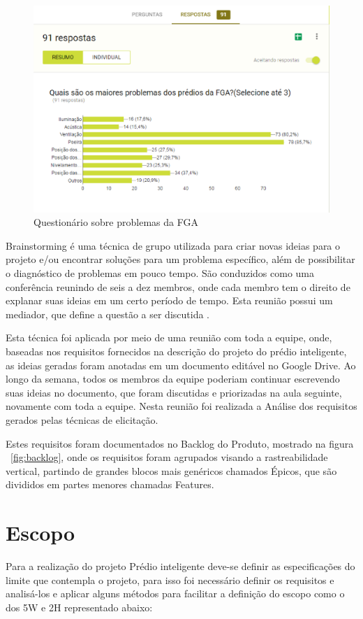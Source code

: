 \begin{figure}[h]
  \caption{Questionário sobre problemas da FGA}
  \centering
    \includegraphics[width=1.0\textwidth]{figuras/pesq.eps}
\end{figure}

Brainstorming é uma técnica de grupo utilizada para criar novas ideias para o projeto e/ou encontrar soluções para um problema específico, além de possibilitar o diagnóstico de problemas em pouco tempo. São conduzidos como uma conferência reunindo de seis a dez membros, onde cada membro tem o direito de explanar suas ideias em um certo período de tempo. Esta reunião possui um mediador, que define a questão a ser discutida \cite{gunda2008}.

Esta técnica foi aplicada por meio de uma reunião com toda a equipe, onde, baseadas nos requisitos fornecidos na descrição do projeto do prédio inteligente, as ideias geradas foram anotadas em um documento editável no Google Drive. Ao longo da semana, todos os membros da equipe poderiam continuar escrevendo suas ideias no documento, que foram discutidas e priorizadas na aula seguinte, novamente com toda a equipe. Nesta reunião foi realizada a Análise dos requisitos gerados pelas técnicas de elicitação.

Estes requisitos foram documentados no Backlog do Produto, mostrado na figura ~\ref{fig:backlog}, onde os requisitos foram agrupados visando a rastreabilidade vertical, partindo de grandes blocos mais genéricos chamados Épicos, que são divididos em partes menores chamadas Features.


\chapter{Escopo}
Para a realização do projeto Prédio inteligente deve-se definir as especificações do limite que contempla o projeto, para isso foi necessário definir os requisitos e analisá-los e aplicar alguns métodos para facilitar a definição do escopo como o dos 5W e 2H representado abaixo:

